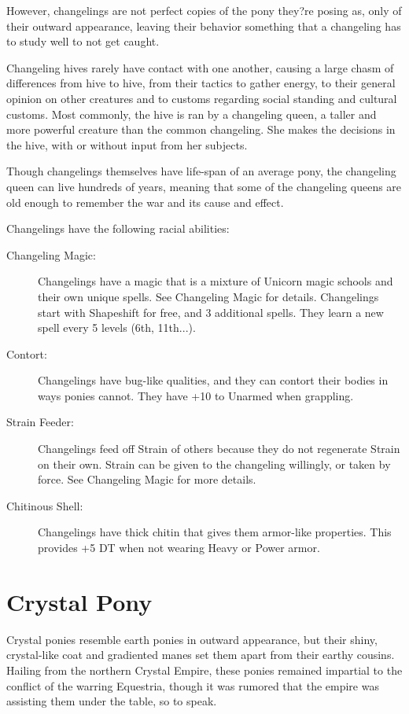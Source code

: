 \documentclass[11pt,a4paper,twocolumn]{book}
\begin{document}
	However, changelings are not perfect copies of the pony they?re posing as, only of their outward appearance, leaving their behavior something that a changeling has to study well to not get caught.
	
	Changeling hives rarely have contact with one another, causing a large chasm of differences from hive to hive, from their tactics to gather energy, to their general opinion on other creatures and to customs regarding social standing and cultural customs. Most commonly, the hive is ran by a changeling queen, a taller and more powerful creature than the common changeling. She makes the decisions in the hive, with or without input from her subjects. 
	
	Though changelings themselves have life-span of an average pony, the changeling queen can live hundreds of years, meaning that some of the changeling queens are old enough to remember the war and its cause and effect.
	
	Changelings have the following racial abilities:
	\begin{description}
		\item[Changeling Magic:] Changelings have a magic that is a mixture of Unicorn magic schools and their own unique spells. See Changeling Magic for details. Changelings start with Shapeshift for free, and 3 additional spells. They learn a new spell every 5 levels (6th, 11th...).
		\item[Contort:] Changelings have bug-like qualities, and they can contort their bodies in ways ponies cannot. They have +10 to Unarmed when grappling.
		\item[Strain Feeder:] Changelings feed off Strain of others because they do not regenerate Strain on their own. Strain can be given to the changeling willingly, or taken by force. See Changeling Magic for more details.
		\item[Chitinous Shell:] Changelings have thick chitin that gives them armor-like properties. This provides +5 DT when not wearing Heavy or Power armor.
	\end{description}
	
	\clearpage
	
	\section*{Crystal Pony}
	
	Crystal ponies resemble earth ponies in outward appearance, but their shiny, crystal-like coat and gradiented manes set them apart from their earthy cousins. Hailing from the northern Crystal Empire, these ponies remained impartial to the conflict of the warring Equestria, though it was rumored that the empire was assisting them under the table, so to speak.
	
\end{document}
